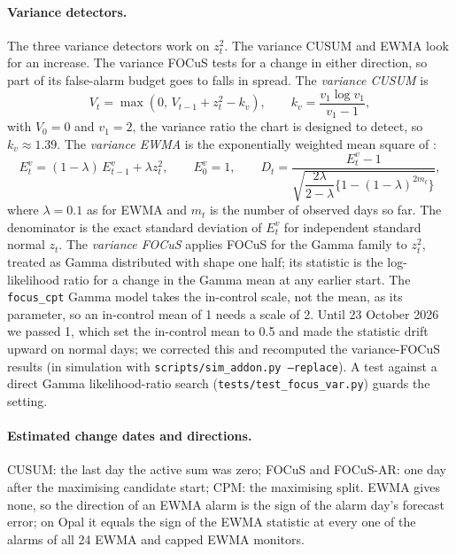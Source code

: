 \paragraph{Variance detectors.} The three variance detectors work on $z_t^2$. The variance CUSUM and EWMA look for an increase. The variance FOCuS tests for a change in either direction, so part of its false-alarm budget goes to falls in spread. The \emph{variance CUSUM} \citep{hawkins1998} is
\begin{equation}\label{eq:varcusum}
  V_t = \max(0,\, V_{t-1} + z_t^2 - k_v), \qquad k_v = \frac{v_1 \log v_1}{v_1 - 1},
\end{equation}
with $V_0 = 0$ and $v_1 = 2$, the variance ratio the chart is designed to detect, so $k_v \approx 1.39$. The \emph{variance EWMA} is the exponentially weighted mean square of \citet{macgregor1993exponentially}:
\begin{equation}\label{eq:varewma}
  E^{v}_t = (1-\lambda)\, E^{v}_{t-1} + \lambda z_t^2, \qquad E^{v}_0 = 1, \qquad
  D_t = \frac{E^{v}_t - 1}{\sqrt{\dfrac{2\lambda}{2-\lambda}\bigl\{1-(1-\lambda)^{2m_t}\bigr\}}} ,
\end{equation}
where $\lambda = 0.1$ as for EWMA and $m_t$ is the number of observed days so far. The denominator is the exact standard deviation of $E^{v}_t$ for independent standard normal $z_t$. The \emph{variance FOCuS} applies FOCuS for the Gamma family \citep{ward2024} to $z_t^2$, treated as Gamma distributed with shape one half; its statistic is the log-likelihood ratio for a change in the Gamma mean at any earlier start. The \texttt{focus\_cpt} Gamma model takes the in-control scale, not the mean, as its parameter, so an in-control mean of 1 needs a scale of 2. Until 23 October 2026 we passed 1, which set the in-control mean to 0.5 and made the statistic drift upward on normal days; we corrected this and recomputed the variance-FOCuS results (in simulation with \texttt{scripts/sim\_addon.py --replace}). A test against a direct Gamma likelihood-ratio search (\texttt{tests/test\_focus\_var.py}) guards the setting.

\paragraph{Estimated change dates and directions.} CUSUM: the last day the active sum was zero; FOCuS and FOCuS-AR: one day after the maximising candidate start; CPM: the maximising split. EWMA gives none, so the direction of an EWMA alarm is the sign of the alarm day's forecast error; on Opal it equals the sign of the EWMA statistic at every one of the alarms of all 24 EWMA and capped EWMA monitors.

